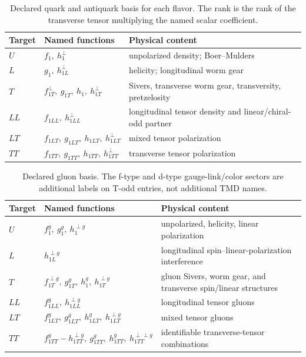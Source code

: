 \documentclass[11pt]{article}
\begin{document}
\begin{table}[ht]
\centering
\caption{Declared quark and antiquark basis for each flavor.  The rank is
the rank of the transverse tensor multiplying the named scalar coefficient.}
\label{tab:quark-basis}
\small
\begin{tabularx}{\textwidth}{L{0.10\textwidth}L{0.56\textwidth}Y}
\toprule
Target & Named functions & Physical content \\
\midrule
\(U\)  & \(f_1,\ h_1^\perp\) & unpolarized density; Boer--Mulders \\
\(L\)  & \(g_1,\ h_{1L}^\perp\) & helicity; longitudinal worm gear \\
\(T\)  & \(f_{1T}^\perp,\ g_{1T},\ h_1,\ h_{1T}^\perp\) &
Sivers, transverse worm gear, transversity, pretzelosity \\
\(LL\) & \(f_{1LL},\ h_{1LL}^\perp\) &
longitudinal tensor density and linear/chiral-odd partner \\
\(LT\) & \(f_{1LT},\ g_{1LT},\ h_{1LT},\ h_{1LT}^\perp\) &
mixed tensor polarization \\
\(TT\) & \(f_{1TT},\ g_{1TT},\ h_{1TT},\ h_{1TT}^\perp\) &
transverse tensor polarization \\
\bottomrule
\end{tabularx}
\end{table}

\begin{table}[ht]
\centering
\caption{Declared gluon basis.  The f-type and d-type gauge-link/color
sectors are additional labels on T-odd entries, not additional TMD names.}
\label{tab:gluon-basis}
\small
\begin{tabularx}{\textwidth}{L{0.10\textwidth}L{0.58\textwidth}Y}
\toprule
Target & Named functions & Physical content \\
\midrule
\(U\) & \(f_1^g,\ g_1^g,\ h_1^{\perp g}\) &
unpolarized, helicity, linear polarization \\
\(L\) & \(h_{1L}^{\perp g}\) & longitudinal spin--linear-polarization interference \\
\(T\) & \(f_{1T}^{\perp g},\ g_{1T}^g,\ h_1^g,\ h_{1T}^{\perp g}\) &
gluon Sivers, worm gear, and transverse spin/linear structures \\
\(LL\) & \(f_{1LL}^g,\ h_{1LL}^{\perp g}\) & longitudinal tensor gluons \\
\(LT\) & \(f_{1LT}^g,\ g_{1LT}^g,\ h_{1LT}^g,\ h_{1LT}^{\perp g}\) &
mixed tensor gluons \\
\(TT\) & \(f_{1TT}^g-h_{1TT}^{\perp g},\
g_{1TT}^g,\ h_{1TT}^g,\ h_{1TT}^{\perp\perp g}\) &
identifiable transverse-tensor combinations \\
\bottomrule
\end{tabularx}
\end{table}
\end{document}
